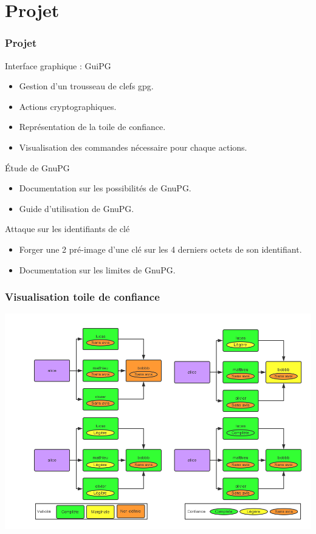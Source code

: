 \section{Projet}
\begin{frame}
    \frametitle{\color{white}Projet}
    \begin{block}{Interface graphique : GuiPG}
      \begin{itemize}
        \item Gestion d'un trousseau de clefs gpg.
        \item Actions cryptographiques.
        \item Représentation de la toile de confiance.
        \item Visualisation des commandes nécessaire pour chaque actions.
      \end{itemize}
    \end{block}
\pause
    \begin{block}{Étude de GnuPG}
    \begin{itemize}
      \item Documentation sur les possibilités de GnuPG.
      \item Guide d'utilisation de GnuPG.
    \end{itemize}
    \pause
    \end{block}
    \begin{block}{Attaque sur les identifiants de clé}
      \begin{itemize}
        \item Forger une 2 pré-image d'une clé sur les 4 derniers octets de son identifiant.
        \item Documentation sur les limites de GnuPG.
      \end{itemize}
    \end{block}
\end{frame}

\begin{frame}
  \frametitle{\color{white}Visualisation toile de confiance}
    \includegraphics[scale=0.3]{tdcdemo.png}
\end{frame}

